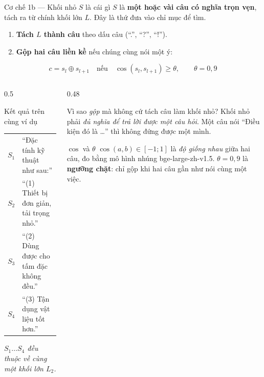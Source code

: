 \documentclass[aspectratio=169,10pt]{beamer}
\newcommand{\src}[1]{{\footnotesize\ttfamily #1}}
\begin{document}
\begin{frame}{Cơ chế 1b --- Khối nhỏ $S$ là cái gì}
  {\footnotesize $S$ là \textbf{một hoặc vài câu có nghĩa trọn vẹn}, tách ra từ chính
  khối lớn $L$. Đây là thứ đưa vào chỉ mục để tìm.}
  \begin{enumerate}\footnotesize
    \item \textbf{Tách $L$ thành câu} theo dấu câu (``.'', ``?'', ``!'').
    \item \textbf{Gộp hai câu liền kề} nếu chúng cùng nói một ý:
  \end{enumerate}
  \begin{equation*}
    c = s_l \oplus s_{l+1}
    \quad\text{nếu}\quad
    \cos(s_l, s_{l+1}) \ge \theta,
    \qquad \theta = 0{,}9
  \end{equation*}
  \begin{columns}[T]
    \begin{column}{0.5\textwidth}
      \begin{block}{\small Kết quả trên cùng ví dụ}
        \footnotesize
        \begin{tabular}{@{}ll@{}}
          $S_1$ & ``Đặc tính kỹ thuật như sau:''\\
          $S_2$ & ``(1) Thiết bị đơn giản, tải trọng nhỏ.''\\
          $S_3$ & ``(2) Dùng được cho tấm đặc không đều.''\\
          $S_4$ & ``(3) Tận dụng vật liệu tốt hơn.''
        \end{tabular}
        \vspace{0.2em}
        {\footnotesize\itshape $S_1 \dots S_4$ \emph{đều thuộc về} cùng một khối lớn $L_2$.}
      \end{block}
    \end{column}
    \begin{column}{0.48\textwidth}
      \begin{block}{\small Vì sao \emph{gộp} mà không cứ tách câu làm khối nhỏ?}
        \footnotesize Khối nhỏ phải \emph{đủ nghĩa để trả lời được một câu hỏi}.
        Một câu nói ``Điều kiện đó là \ldots'' thì không đứng được một mình.
      \end{block}
      \begin{block}{\small $\cos$ và $\theta$}
        \footnotesize $\cos(a,b) \in [-1; 1]$ là \emph{độ giống nhau} giữa hai câu,
        đo bằng mô hình nhúng \src{bge-large-zh-v1.5}.
        $\theta = 0{,}9$ là \textbf{ngưỡng chặt}: chỉ gộp khi hai câu gần như nói cùng một việc.
      \end{block}
    \end{column}
  \end{columns}
\end{frame}
\end{document}
